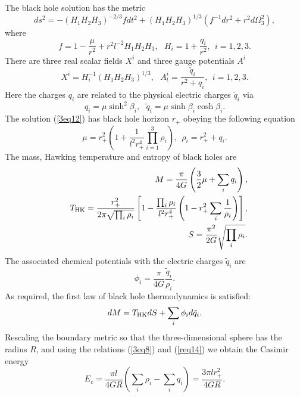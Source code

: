 \documentclass[a4paper,12pt]{article}
\begin{document}
The black hole solution has the metric
\begin{equation}
\label{3eq12}
ds^2 =-(H_1H_2H_3)^{-2/3} fdt^2 +(H_1H_2H_3)^{1/3}(f^{-1}dr^2 +r^2d\Omega_3^2),
\end{equation}
where 
\begin{equation}
\label{3eq13}
f =1 -\frac{\mu}{r^2}+r^2l^{-2} H_1 H_2 H_3, \ \ \  H_i=1+\frac{q_i}{r^2}, \ \ 
 i =1, 2, 3.
\end{equation}
There are three real scalar fields $X^i$ and three gauge potentials $A^i$  
\begin{equation}
\label{3eq14}
X^i = H_i^{-1}(H_1H_2 H_3)^{1/3}, \ \ \ A^i_t = \frac{\tilde q_i}{r^2 +q_i},
\ \ i=1, 2, 3.
\end{equation}
Here the charges $q_i$ are related to the physical electric charges 
$\tilde q_i$ via
\begin{equation}
\label{3eq15}
q_i=\mu \sinh^2\beta_i, \ \ \ \tilde q_i =\mu \sinh\beta_i \cosh\beta_i.
\end{equation}
The solution (\ref{3eq12}) has black hole horizon $r_+$ obeying the following
equation
\begin{equation}
\label{3eq16}
\mu = r_+^2 \left (1+\frac{1}{l^2 r_+^4} \prod _{i=1}^3 \rho_i \right), \ \
 \rho_i =r_+^2 +q_i.
\end{equation}  
The mass, Hawking temperature and entropy of black holes are 
\begin{eqnarray}
\label{3eq17}
&&M =\frac{\pi}{4G}\left (\frac{3}{2}\mu +\sum_{i}q_i\right), \nonumber \\
&& T_{\rm HK} =\frac{r_+^2}{2\pi \sqrt{\prod_i \rho_i}}\left [
   1-\frac{\prod_i \rho_i}{l^2 r_+^4}\left (1-r_+^2 \sum_i \frac{1}{\rho_i}
   \right) \right], \nonumber \\
&& S =\frac{\pi^2}{2G}\sqrt{\prod_i \rho_i}.
\end{eqnarray}
The associated chemical potentials with the electric charges $\tilde q_i$ are
\begin{equation}
\phi_i = \frac{\pi}{4G}\frac{\tilde q_i}{\rho_i}.
\end{equation}
As required, the first law of black hole thermodynamics is satisfied: 
\begin{equation}
dM = T_{\rm HK}dS +\sum_i \phi_i d\tilde q_i.
\end{equation}
Rescaling the boundary metric so that the three-dimensional sphere
has the radius $R$, and using the relations (\ref{3eq8}) and (\ref{req14})
 we obtain the Casimir energy
\begin{equation}
\label{3eq20}
E_c =\frac{\pi l}{4GR}(\sum_i \rho_i-\sum_iq_i) = \frac{3\pi lr_+^2}{4GR}.
\end{equation}
\end{document}
